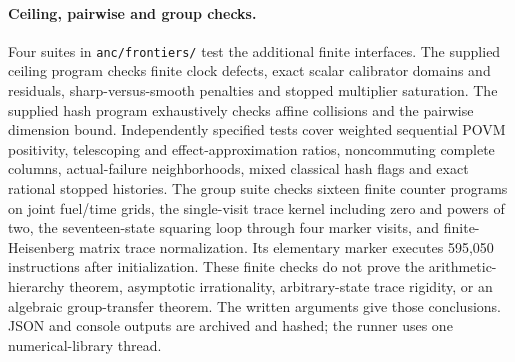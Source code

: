 \paragraph{Ceiling, pairwise and group checks.} Four suites in \texttt{anc/frontiers/} test the additional finite interfaces. The supplied ceiling program checks finite clock defects, exact scalar calibrator domains and residuals, sharp-versus-smooth penalties and stopped multiplier saturation. The supplied hash program exhaustively checks affine collisions and the pairwise dimension bound. Independently specified tests cover weighted sequential POVM positivity, telescoping and effect-approximation ratios, noncommuting complete columns, actual-failure neighborhoods, mixed classical hash flags and exact rational stopped histories. The group suite checks sixteen finite counter programs on joint fuel/time grids, the single-visit trace kernel including zero and powers of two, the seventeen-state squaring loop through four marker visits, and finite-Heisenberg matrix trace normalization. Its elementary marker executes 595,050 instructions after initialization. These finite checks do not prove the arithmetic-hierarchy theorem, asymptotic irrationality, arbitrary-state trace rigidity, or an algebraic group-transfer theorem. The written arguments give those conclusions. JSON and console outputs are archived and hashed; the runner uses one numerical-library thread.
